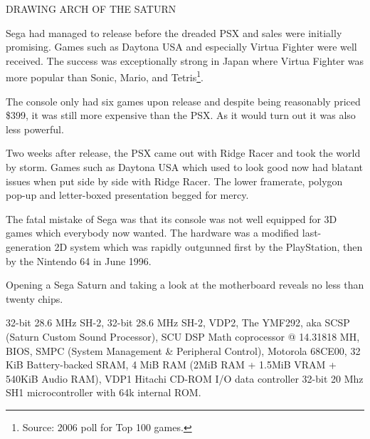 DRAWING ARCH OF THE SATURN\\
\par
\vspace{10cm}
\par
Sega had managed to release before the dreaded PSX and sales were initially promising. Games such as Daytona USA and especially Virtua Fighter were well received. The success was exceptionally strong in Japan where Virtua Fighter was more popular than Sonic, Mario, and Tetris\footnote{Source: 2006 poll for Top 100 games.}.\\
\par
The console only had six games upon release and despite being reasonably priced \$399, it was still more expensive than the PSX. As it would turn out it was also less powerful.\\
\par
 Two weeks after release, the PSX came out with Ridge Racer and took the world by storm. Games such as Daytona USA which used to look good now had blatant issues when put side by side with Ridge Racer. The lower framerate, polygon pop-up and letter-boxed presentation begged for mercy.\\
\par
The fatal mistake of Sega was that its console was not well equipped for 3D games which everybody now wanted. The hardware was a modified last-generation 2D system which was rapidly outgunned first by the PlayStation, then by the Nintendo 64 in June 1996.








\par
Opening a Sega Saturn and taking a look at the motherboard reveals no less than twenty chips.\\
\par
{} 32-bit 28.6 MHz SH-2, 
 32-bit 28.6 MHz SH-2, 
 VDP2, 
 The YMF292, aka SCSP (Saturn Custom Sound Processor), 
 SCU DSP Math coprocessor @ 14.31818 MH, 
 BIOS, 
 SMPC (System Management \& Peripheral Control), 
 Motorola 68CE00, 
 32 KiB Battery-backed SRAM, 
 4 MiB RAM (2MiB RAM + 1.5MiB VRAM + 540KiB Audio RAM), 
 VDP1 
 Hitachi CD-ROM I/O data controller
 32-bit 20 Mhz SH1  microcontroller with 64k internal ROM.


